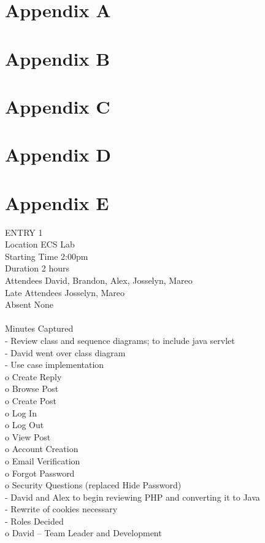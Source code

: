 \documentclass{report}
\begin{document}
\section{Appendix A}
\section{Appendix B}
\section{Appendix C}
\section{Appendix D}
\section{Appendix E}
ENTRY 1\\	
Location		ECS Lab\\
Starting Time		2:00pm\\
Duration		2 hours\\
Attendees		David, Brandon, Alex, Josselyn, Mareo\\
Late Attendees	Josselyn, Mareo\\
Absent		None\\
\\
Minutes Captured\\
-	Review class and sequence diagrams; to include java servlet\\
-	David went over class diagram\\
-	Use case implementation\\
o	Create Reply\\
o	Browse Post\\
o	Create Post\\
o	Log In\\
o	Log Out\\
o	View Post\\
o	Account Creation\\
o	Email Verification\\
o	Forgot Password\\
o	Security Questions (replaced Hide Password)\\
-	David and Alex to begin reviewing PHP and converting it to Java\\
-	Rewrite of cookies necessary\\
-	Roles Decided\\
o	David – Team Leader and Development\\
\end{document}
